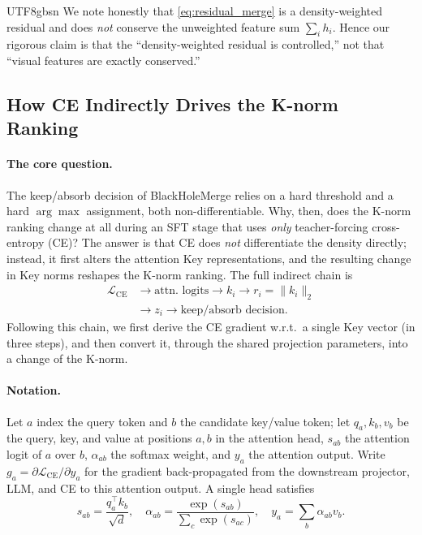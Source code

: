 \documentclass[10pt,twocolumn,letterpaper]{article}
\newcommand{\ours}{BlackHoleMerge}
\begin{document}
\begin{CJK}{UTF8}{gbsn}
We note honestly that \eqref{eq:residual_merge} is a density-weighted residual
and does \emph{not} conserve the unweighted feature sum $\sum_i h_i$. Hence our
rigorous claim is that the ``density-weighted residual is controlled,'' not that ``visual features are exactly conserved.''

\subsection{How CE Indirectly Drives the K-norm Ranking}

\paragraph{The core question.}
The keep/absorb decision of \ours{} relies on a hard threshold and a hard
$\arg\max$ assignment, both non-differentiable. Why, then, does the K-norm
ranking change at all during an SFT stage that uses \emph{only} teacher-forcing
cross-entropy (CE)? The answer is that CE does \emph{not} differentiate the
density directly; instead, it first alters the attention Key representations, and
the resulting change in Key norms reshapes the K-norm ranking. The full indirect
chain is
\begin{equation}
\begin{aligned}
    \mathcal{L}_{\mathrm{CE}}
    &\longrightarrow \text{attn. logits}
    \longrightarrow k_i
    \longrightarrow r_i=\lVert k_i\rVert_2\\
    &\longrightarrow z_i
    \longrightarrow \text{keep/absorb decision}.
\end{aligned}
    \label{eq:ce_ranking_chain}
\end{equation}
Following this chain, we first derive the CE gradient w.r.t.\ a single Key vector
(in three steps), and then convert it, through the shared projection parameters,
into a change of the K-norm.
\paragraph{Notation.}
Let $a$ index the query token and $b$ the candidate key/value token; let
$q_a,k_b,v_b$ be the query, key, and value at positions $a,b$ in the attention
head, $s_{ab}$ the attention logit of $a$ over $b$, $\alpha_{ab}$ the softmax
weight, and $y_a$ the attention output. Write
$g_a=\partial\mathcal{L}_{\mathrm{CE}}/\partial y_a$ for the gradient
back-propagated from the downstream projector, LLM, and CE to this attention
output. A single head satisfies
\begin{equation}
    s_{ab}=\frac{q_a^\top k_b}{\sqrt d},\quad
    \alpha_{ab}=\frac{\exp(s_{ab})}{\sum_c\exp(s_{ac})},\quad
    y_a=\sum_b\alpha_{ab}v_b.
    \label{eq:attention}
\end{equation}


\end{CJK}
\end{document}
